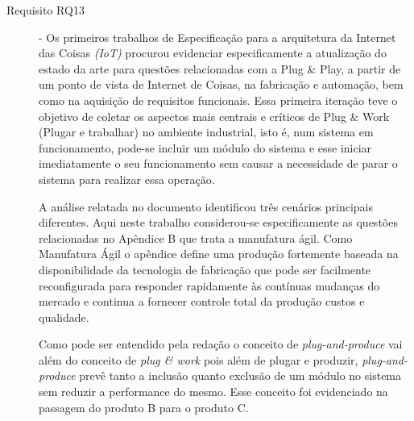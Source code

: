 \documentclass[10pt,letterpaper,twocolumn]{IEEEtran}
\begin{document}
\begin{description}
	\item[Requisito RQ13] - Os primeiros trabalhos de Especificação para a arquitetura da Internet das Coisas \textit{(IoT)} procurou evidenciar especificamente a atualização do estado da arte para questões relacionadas com a Plug \& Play, a partir de um ponto de vista de Internet de Coisas, na fabricação e automação, bem como na aquisição de requisitos funcionais. Essa primeira iteração teve o objetivo de coletar os aspectos mais centrais e críticos de Plug \& Work (Plugar e trabalhar) no ambiente industrial, isto é, num sistema em funcionamento, pode-se incluir um módulo do sistema e esse iniciar imediatamente o seu funcionamento sem causar a necessidade de parar o sistema para realizar essa operação. \par 
	
	A análise relatada  no documento identificou três cenários principais diferentes. Aqui neste trabalho considerou-se especificamente as questões relacionadas no Apêndice B que trata a manufatura ágil. Como Manufatura Ágil o apêndice define uma produção fortemente baseada na disponibilidade da tecnologia de fabricação que pode ser facilmente reconfigurada para responder rapidamente às contínuas mudanças do mercado e continua a fornecer controle total da produção custos e qualidade. \par 
	Como pode ser entendido pela redação o conceito de \textit{plug-and-produce} vai além do conceito de \textit{plug \& work} pois além de plugar e produzir, \textit{plug-and-produce} prevê tanto a inclusão quanto  exclusão de um módulo no sistema sem reduzir a performance do mesmo. Esse conceito foi evidenciado na passagem do produto B para o produto C.	
	

\end{description}
\end{document}

